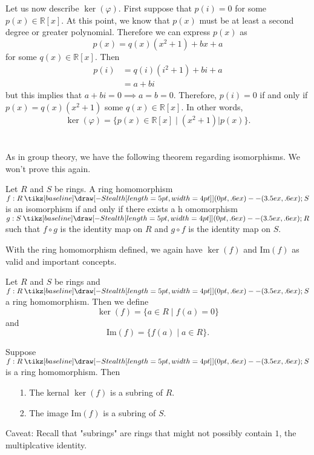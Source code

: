\documentclass[12pt,letterpaper]{algebra_book}
\renewcommand{\to}{\mathbin{\tikz[baseline] \draw[-{Stealth[length=5pt,width=4pt]}] (0pt,.6ex) -- (3.5ex,.6ex);}}
\newcommand{\im}{\mbox{Im}}
\newcommand{\RR}{\mathbb{R}}
\renewcommand{\phi}{\varphi}
\theoremstyle{definition}
\begin{document}
    Let us now describe $\ker(\phi)$. First suppose that $p(i) =
    0$ for some $p(x) \in \RR[x]$. At this point, we know that $p(x)$ must be at least a
    second degree or greater polynomial. Therefore we can express $p(x)$ 
    as 
    \[
        p(x) = q(x)(x^2 + 1) + bx + a
    \]
    for some $q(x) \in \RR[x]$. Then 
    \begin{align*}
        p(i) &= q(i)(i^2 + 1) + bi + a \\
            &= a + bi
    \end{align*}
    but this implies that $a + bi = 0 \implies a = b = 0$.
    Therefore, $p(i) = 0$ if and only if $p(x) = q(x)(x^2 + 1)$
    some $q(x) \in \RR[x]$. In other words, 
    \[
        \ker(\phi) = \{p(x) \in \RR[x] \mid (x^2 + 1)\big|p(x)\}.
    \]
    \\
    \\
    As in group theory, we have the following theorem regarding
    isomorphisms. We won't prove this again. 


    \begin{thm}
        Let $R$ and $S$ be rings. A ring homomorphism $f: R \to S$ is an
        isomorphism if and only if there exists a h             omomorphism $g:
        S \to R$ such that $f \circ g$ is the identity map on
        $R$ and $g \circ f$ is the identity map on
        $S$.
    \end{thm}

    With the ring homomorphism defined, we again have $\ker(f)$
    and $\im(f)$ as valid and important concepts.
    \begin{definition}
        Let $R$ and $S$ be rings and $f: R \to S$ a ring
        homomorphism. Then we define 
        \[
            \ker(f) = \{a \in R \mid f(a) = 0\}  
        \]
        and 
        \[
            \im(f) = \{f(a) \mid a \in R\}.
        \]
    \end{definition}

    \begin{proposition}
        Suppose $f: R \to S$ is a ring homomorphism. Then 
        \begin{itemize}
            \item[1.] The kernal $\ker(f)$ is a subring of $R$.
            \item[2.] The image $\im(f)$ is a subring of $S$.  
        \end{itemize}
    \end{proposition}
    Caveat: Recall that "subrings" are rings that might not
    possibly contain $1$, the multiplcative identity.
\end{document}
